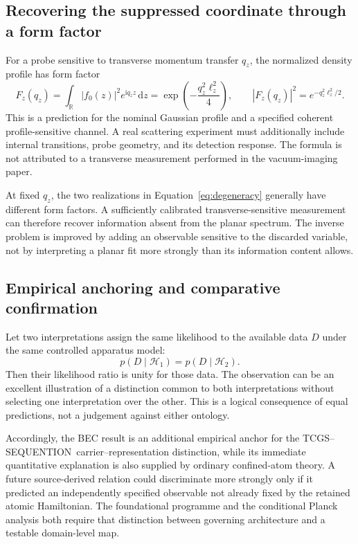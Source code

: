 \documentclass[11pt,a4paper]{article}
\theoremstyle{definition}
\theoremstyle{remark}
\newcommand{\TCGS}{TCGS--SEQUENTION}
\newcommand{\dd}{\mathrm{d}}
\newcommand{\ii}{\mathrm{i}}
\newcommand{\R}{\mathbb{R}}
\newcommand{\lop}{\ell_z}
\begin{document}
\subsection{Recovering the suppressed coordinate through a form factor}
For a probe sensitive to transverse momentum transfer $q_z$, the normalized density profile has form factor
\begin{equation}
 F_z(q_z)=\int_{\R}|f_0(z)|^2e^{\ii q_zz}\,\dd z
 =\exp\!\left(-\frac{q_z^2\lop^2}{4}\right),
 \qquad |F_z(q_z)|^2=e^{-q_z^2\lop^2/2}.
 \label{eq:formfactor}
\end{equation}
This is a prediction for the nominal Gaussian profile and a specified coherent profile-sensitive channel. A real scattering experiment must additionally include internal transitions, probe geometry, and its detection response. The formula is not attributed to a transverse measurement performed in the vacuum-imaging paper.

At fixed $q_z$, the two realizations in Equation~\eqref{eq:degeneracy} generally have different form factors. A sufficiently calibrated transverse-sensitive measurement can therefore recover information absent from the planar spectrum. The inverse problem is improved by adding an observable sensitive to the discarded variable, not by interpreting a planar fit more strongly than its information content allows.

\subsection{Empirical anchoring and comparative confirmation}
Let two interpretations assign the same likelihood to the available data $D$ under the same controlled apparatus model:
\begin{equation}
 p(D\mid\mathcal H_1)=p(D\mid\mathcal H_2).
 \label{eq:equal_likelihood}
\end{equation}
Then their likelihood ratio is unity for those data. The observation can be an excellent illustration of a distinction common to both interpretations without selecting one interpretation over the other. This is a logical consequence of equal predictions, not a judgement against either ontology.

Accordingly, the BEC result is an additional empirical anchor for the \TCGS\ carrier--representation distinction, while its immediate quantitative explanation is also supplied by ordinary confined-atom theory. A future source-derived relation could discriminate more strongly only if it predicted an independently specified observable not already fixed by the retained atomic Hamiltonian. The foundational programme and the conditional Planck analysis both require that distinction between governing architecture and a testable domain-level map.\cite{foundation,planck}
\end{document}
